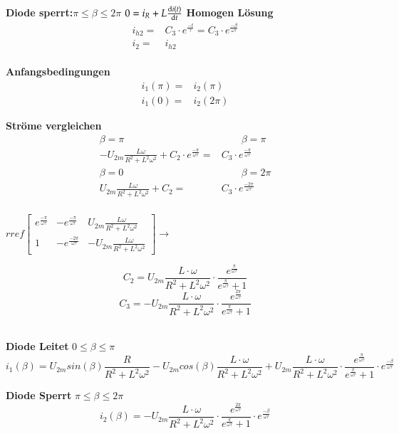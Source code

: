 \textbf{Diode sperrt:}$ \pi \leq \beta \leq 2\pi$\newline
$0 = i_R + L\frac{\mathop{}\!\mathrm{d} i(t)}{\mathop{}\!\mathrm{d} t}$\newline
\textbf{Homogen Lösung}
\begin{align*}
i_{h2} = & C_3 \cdot e^{\frac{-t}{\tau}} = C_3 \cdot e^{\frac{-\beta}{\omega \tau}}\\
i_2 = & i_{h2}
\end{align*}
\\
\textbf{Anfangsbedingungen}
\begin{align*}
    i_1(\pi) = & i_2(\pi)\\
    i_1(0)  = & i_2(2\pi)
\end{align*}

\textbf{Ströme vergleichen}
\begin{align*}
    \beta = \pi \qquad & \qquad \beta = \pi\\
    - U_{2m} \frac{L\omega}{R^2 + L^2\omega^2} + C_2 \cdot e^{\frac{-\pi}{\omega \tau}} = & C_3 \cdot e^{\frac{-\pi}{\omega \tau}}\\
    \beta = 0 \qquad & \qquad \beta = 2\pi\\
    U_{2m} \frac{L\omega}{R^2 + L^2\omega^2} + C_2  = & C_3 \cdot e^{\frac{-2\pi}{\omega \tau}}\\  
\end{align*}
\begin{minipage}{7cm}
    $rref
    \begin{bmatrix}
    e^{\frac{-\pi}{\omega \tau}}       &-e^{\frac{-\pi}{\omega \tau}}  & U_{2m} \frac{L\omega}{R^2 + L^2\omega^2} \\ 
    1& -e^{\frac{-2\pi}{\omega \tau}}         & -U_{2m} \frac{L\omega}{R^2 + L^2\omega^2}
    \end{bmatrix} 
    \rightarrow$ 
\end{minipage}
\begin{minipage}{5cm}
    \[ C_2 = U_{2m} \frac{L \cdot \omega}{R^2 + L^2\omega^2} \cdot  \frac{e^{\frac{\pi}{\omega \tau}}}{e^{\frac{\pi}{\omega \tau}} +1} \]
    \[ C_3 = -U_{2m} \frac{L \cdot \omega}{R^2 + L^2\omega^2} \cdot  \frac{e^{\frac{2\pi}{\omega \tau}}}{e^{\frac{\pi}{\omega \tau}} +1} \]
\end{minipage}
\\
\textbf{Diode Leitet} $ 0 \leq \beta \leq \pi $\newline
\[ i_{1}(\beta) =  U_{2m} sin(\beta) \frac{R}{R^2 + L^2\omega^2} - U_{2m} cos(\beta) \frac{L \cdot \omega}{R^2 + L^2\omega^2} + U_{2m} \frac{L \cdot \omega}{R^2 + L^2\omega^2} \cdot  \frac{e^{\frac{\pi}{\omega \tau}}}{e^{\frac{\pi}{\omega \tau}} +1} \cdot e^{\frac{-\beta}{\omega \tau}} \]

\textbf{Diode Sperrt} $ \pi \leq \beta \leq 2\pi $\newline
\[ i_2(\beta) = -U_{2m} \frac{L \cdot \omega}{R^2 + L^2\omega^2} \cdot  \frac{e^{\frac{2\pi}{\omega \tau}}}{e^{\frac{\pi}{\omega \tau}} +1} \cdot e^{\frac{-\beta}{\omega \tau}} \]
\clearpage













